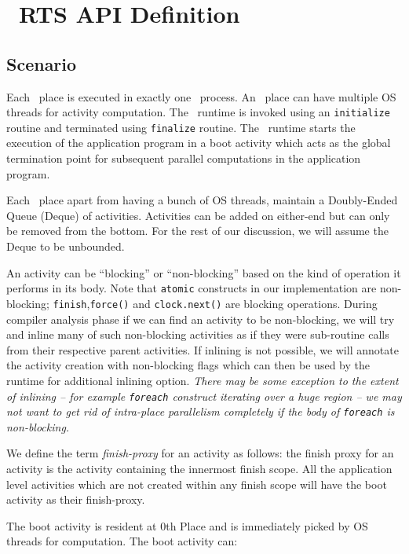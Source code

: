 \section{\Xten\ RTS API Definition} \label{sec:runtime}

\subsection{Scenario}

Each \Xten\ place is executed in exactly one \Xten\ process. An \Xten\ place can
have multiple OS threads for activity computation. The \Xten\ runtime is invoked
using an {\tt initialize} routine and terminated using {\tt finalize} routine.
The \Xten\ runtime starts the execution of the application program in a boot
activity which acts as the global termination point for subsequent parallel
computations in the application program. 


Each \Xten\ place apart from having a bunch of OS threads, maintain a
Doubly-Ended Queue (Deque) of activities. Activities can be added on either-end
but can only be removed from the bottom. For the rest of our discussion, we
will assume the Deque to be unbounded.  

An activity can be ``blocking'' or ``non-blocking'' based on the kind of
operation it performs in its body. Note that {\tt atomic} 
constructs in our implementation are non-blocking; {\tt finish{}},{\tt force()}
and {\tt clock.next()} are blocking operations. During compiler analysis phase
if we can find an activity to be non-blocking, we will try and inline many of
such non-blocking activities as if they were sub-routine calls from their
respective parent activities. If inlining is not possible, we will annotate the
activity creation with non-blocking flags which can then be used by the runtime
for additional inlining option. {\it There may be some exception to the extent
of inlining -- for example {\tt foreach} construct iterating over a huge region
-- we may not want to get rid of intra-place parallelism completely if the body
of {\tt foreach} is non-blocking.} 

We define the term {\it finish-proxy} for an activity as follows: the finish
proxy for an activity is the activity containing the innermost finish scope.
All the application level activities which are not created within any finish
scope will have the boot activity as their finish-proxy.

The boot activity is resident at 0th Place and is immediately picked by OS
threads for computation. The boot activity can:

